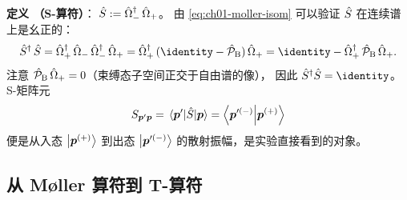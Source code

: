 \textbf{定义 \thedefinition\label{def:ch01-Sop}（S-算符）}：
$\hat{S} := \hat{\Omega}_{-}^{\dagger}\, \hat{\Omega}_{+}$。
由 \cref{eq:ch01-moller-isom} 可以验证 $\hat{S}$ 在连续谱上是幺正的：
\begin{equation}
  \Sop^{\dagger}\, \Sop = \Mollerp^{\dagger}\, \Mollerm\, \Mollerm^{\dagger}\, \Mollerp
  = \Mollerp^{\dagger}\,(\identity - \Pop_{\text{B}})\,\Mollerp
  = \identity - \Mollerp^{\dagger}\, \Pop_{\text{B}}\, \Mollerp.
  \label{eq:ch01-S-unitary-step}
\end{equation}
注意 $\hat{\mathcal{P}}_{\text{B}}\, \hat{\Omega}_{+} = 0$（束缚态子空间正交于自由谱的像），
因此 $\Sop^{\dagger}\Sop = \identity$。
S-矩阵元
\begin{equation}
  S_{\bvec{p}'\bvec{p}} = \matrixel{\bvec{p}'}{\Sop}{\bvec{p}} = \braket{\bvec{p}'^{(-)}}{\bvec{p}^{(+)}}
  \label{eq:ch01-Spp}
\end{equation}
便是从入态 $\ket{\bm{p}^{(+)}}$ 到出态 $\ket{\bm{p}'^{(-)}}$ 的散射振幅，是实验直接看到的对象。

\subsection{从 Møller 算符到 T-算符}


